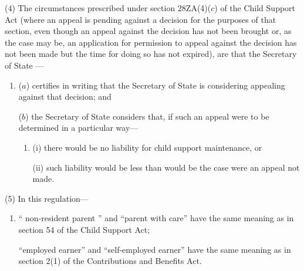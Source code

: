 \documentclass[12pt,a4paper]{article}
\begin{document}
(4) The circumstances prescribed under section 28ZA(4)($c$) of the Child Support Act (where an appeal is pending against a decision for the purposes of that section, even though an appeal against the decision has not been brought or, as the case may be, an application for 
permission  %
to appeal against the decision has not been made but the time for doing so has not expired), are that the 
Secretary of State%
—
\begin{enumerate}\item[]
($a$) certifies in writing that 
the Secretary of State  %
is considering appealing against that decision; and

($b$) 
the Secretary of State  %
considers that, if such an appeal were to be determined in a particular way—
\begin{enumerate}\item[]
(i) there would be no liability for child support maintenance, or

(ii) such liability would be less than would be the case were an appeal not made.
\end{enumerate}
\end{enumerate}

(5) In this regulation—
\begin{enumerate}\item[]
“%
non-resident parent%
” and “parent with care” have the same meaning as in section 54 of the Child Support Act;

“employed earner” and “self-employed earner” have the same meaning as in section 2(1) of the Contributions and Benefits Act.
\end{enumerate}
\end{document}
